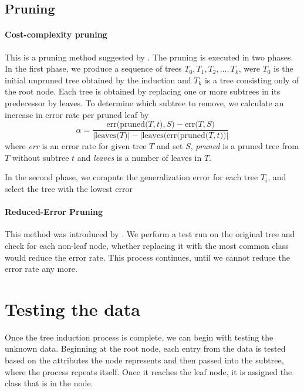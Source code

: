 \documentclass[thesis=B,english]{FITthesis}[2012/10/20]
\begin{document}
		\subsection{Pruning}
		\label{sec:pruning}
				\paragraph*{Cost-complexity pruning}

				This is a pruning method suggested by \cite{CART}. The pruning is executed in two phases. In the first phase, we produce a sequence of trees \(T_0, T_1, T_2, \dots, T_k \), were \(T_0\) is the initial unpruned tree obtained by the induction and \(T_k\) is a tree consisting only of the root node. Each tree is obtained by replacing one or more subtrees in its predecessor by leaves. To determine which subtree to remove, we calculate an increase in error rate per pruned leaf by 
				\[\alpha = \frac{\mathrm{err(pruned(}T,t\mathrm{)},S\mathrm{)} - \mathrm{err(}T,S\mathrm{)}}{|\mathrm{leaves(}T\mathrm{)}|-|\mathrm{leaves(}\mathrm{err(pruned(}T,t\mathrm{)}\mathrm{)}|}\]
				where \emph{err} is an error rate for given tree \(T\) and set \(S\), \emph{pruned} is a pruned tree from \(T\) without subtree \(t\) and \emph{leaves} is a number of leaves in \(T\).

				In the second phase, we compute the generalization error for each tree \(T_i\), and select the tree with the lowest error

				\paragraph*{Reduced-Error Pruning}

				This method was introduced by \cite{Quinlan1987221}. We perform a test run on the original tree and check for each non-leaf node, whether replacing it with the most common class would reduce the error rate. This process continues, until we cannot reduce the error rate any more.

		\section{Testing the data}
		Once the tree induction process is complete, we can begin with testing the unknown data. Beginning at the root node, each entry from the data is tested based on the attributes the node represents and then passed into the subtree, where the process repeats itself. Once it reaches the leaf node, it is assigned the class that is in the node.
		
\end{document}
